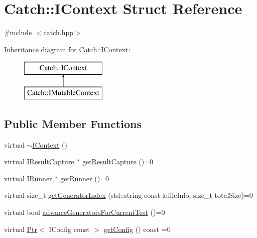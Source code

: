 \hypertarget{struct_catch_1_1_i_context}{}\section{Catch\+:\+:I\+Context Struct Reference}
\label{struct_catch_1_1_i_context}


{\ttfamily \#include $<$catch.\+hpp$>$}

Inheritance diagram for Catch\+:\+:I\+Context\+:\begin{figure}[H]
\begin{center}
\leavevmode
\includegraphics[height=2.000000cm]{struct_catch_1_1_i_context}
\end{center}
\end{figure}
\subsection*{Public Member Functions}
\begin{DoxyCompactItemize}
\item 
virtual \mbox{\hyperlink{struct_catch_1_1_i_context_aeb17355c1be6c2ced5407cad7202628d}{$\sim$\+I\+Context}} ()
\item 
virtual \mbox{\hyperlink{struct_catch_1_1_i_result_capture}{I\+Result\+Capture}} $\ast$ \mbox{\hyperlink{struct_catch_1_1_i_context_a684e4ae71d1fdf3060c352ecde1d122f}{get\+Result\+Capture}} ()=0
\item 
virtual \mbox{\hyperlink{struct_catch_1_1_i_runner}{I\+Runner}} $\ast$ \mbox{\hyperlink{struct_catch_1_1_i_context_af088415dde18d039ed5a2f95b02767c6}{get\+Runner}} ()=0
\item 
virtual size\+\_\+t \mbox{\hyperlink{struct_catch_1_1_i_context_a43e07088db43299ba129fbe6d3106e95}{get\+Generator\+Index}} (std\+::string const \&file\+Info, size\+\_\+t total\+Size)=0
\item 
virtual bool \mbox{\hyperlink{struct_catch_1_1_i_context_a806f7c4ed24d51adae90418e661b24b7}{advance\+Generators\+For\+Current\+Test}} ()=0
\item 
virtual \mbox{\hyperlink{class_catch_1_1_ptr}{Ptr}}$<$ I\+Config const  $>$ \mbox{\hyperlink{struct_catch_1_1_i_context_aee81c415899262e096ad8d6f686fa365}{get\+Config}} () const =0
\end{DoxyCompactItemize}


